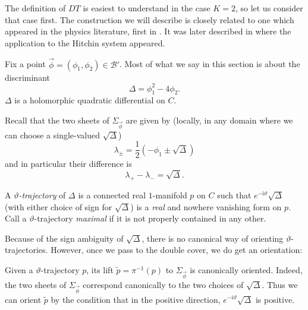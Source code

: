 \documentclass[12pt,letterpaper,reqno]{article}
\numberwithin{equation}{section}
\newcommand{\cB}{\ensuremath{\mathcal B}}
\newcommand{\half}{\ensuremath{\frac{1}{2}}}
\newcommand{\I}{{\mathrm i}}
\newcommand{\ti}[1]{\textit{#1}}
\begin{document}
The definition of $DT$ is easiest to understand in the
case $K=2$, so let us consider that case first.
The construction we will describe is closely related to one
which appeared in the physics literature, first in \cite{Klemm:1996bj}.
It was later described in \cite{Gaiotto:2009hg} where the application
to the Hitchin system appeared.

Fix a point $\vec\phi = (\phi_1, \phi_2) \in \cB'$.
Most of what we say in this section is about the discriminant
\begin{equation}
\Delta = \phi_1^2	- 4 \phi_2.
\end{equation}
$\Delta$ is a holomorphic quadratic differential on $C$.

Recall that the two sheets of $\Sigma_{\vec\phi}$ are given by
(locally, in any domain where we can choose a single-valued $\sqrt{\Delta}$)
\begin{equation}
	\lambda_{\pm} = \half (-\phi_1 \pm \sqrt{\Delta})
\end{equation}
and in particular their difference is
\begin{equation}
	\lambda_+ - \lambda_- = \sqrt{\Delta}.
\end{equation}

\begin{defn}
A \ti{$\vartheta$-trajectory} of $\Delta$ is a connected
real $1$-manifold $p$ on $C$
such that $e^{- \I \vartheta} \sqrt \Delta$ (with either choice of sign
for $\sqrt{\Delta}$) is a
\ti{real} and nowhere vanishing form on $p$.
Call a $\vartheta$-trajectory \ti{maximal} if
it is not properly contained in any other.
\end{defn}

Because of the sign ambiguity of $\sqrt{\Delta}$, there is no canonical
way of orienting $\vartheta$-trajectories. However, once we pass to the
double cover, we do get an orientation:

\begin{defn}
Given a $\vartheta$-trajectory $p$, its lift $\tilde{p} = \pi^{-1}(p)$
to $\Sigma_{\vec\phi}$ is canonically oriented. Indeed,
the two sheets of $\Sigma_{\vec\phi}$
correspond canonically to the two choices of $\sqrt{\Delta}$.
Thus we can orient $\tilde{p}$ by the condition that
in the positive direction, $e^{-\I \vartheta} \sqrt{\Delta}$
is positive.
\end{defn}
\end{document}
